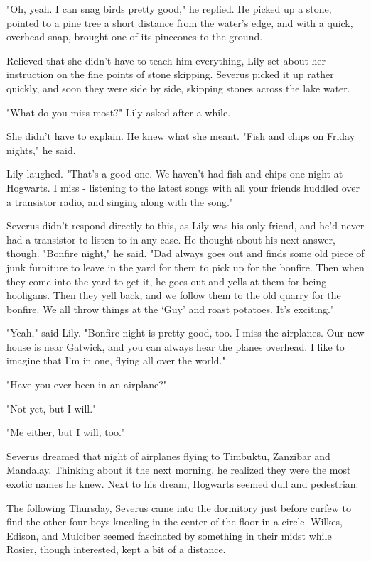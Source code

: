 \documentclass[a4paper,11pt]{article}
\begin{document}
"Oh, yeah. I can snag birds pretty good," he replied. He picked up a stone, pointed to a pine tree a short distance from the water's edge, and with a quick, overhead snap, brought one of its pinecones to the ground.

Relieved that she didn't have to teach him everything, Lily set about her instruction on the fine points of stone skipping. Severus picked it up rather quickly, and soon they were side by side, skipping stones across the lake water.

"What do you miss most?" Lily asked after a while.

She didn't have to explain. He knew what she meant. "Fish and chips on Friday nights," he said.

Lily laughed. "That's a good one. We haven't had fish and chips one night at Hogwarts. I miss - listening to the latest songs with all your friends huddled over a transistor radio, and singing along with the song."

Severus didn't respond directly to this, as Lily was his only friend, and he'd never had a transistor to listen to in any case. He thought about his next answer, though. "Bonfire night," he said. "Dad always goes out and finds some old piece of junk furniture to leave in the yard for them to pick up for the bonfire. Then when they come into the yard to get it, he goes out and yells at them for being hooligans. Then they yell back, and we follow them to the old quarry for the bonfire. We all throw things at the `Guy' and roast potatoes. It's exciting."

"Yeah," said Lily. "Bonfire night is pretty good, too. I miss the airplanes. Our new house is near Gatwick, and you can always hear the planes overhead. I like to imagine that I'm in one, flying all over the world."

"Have you ever been in an airplane?"

"Not yet, but I will."

"Me either, but I will, too."

Severus dreamed that night of airplanes flying to Timbuktu, Zanzibar and Mandalay. Thinking about it the next morning, he realized they were the most exotic names he knew. Next to his dream, Hogwarts seemed dull and pedestrian.

The following Thursday, Severus came into the dormitory just before curfew to find the other four boys kneeling in the center of the floor in a circle. Wilkes, Edison, and Mulciber seemed fascinated by something in their midst while Rosier, though interested, kept a bit of a distance.
\end{document}
